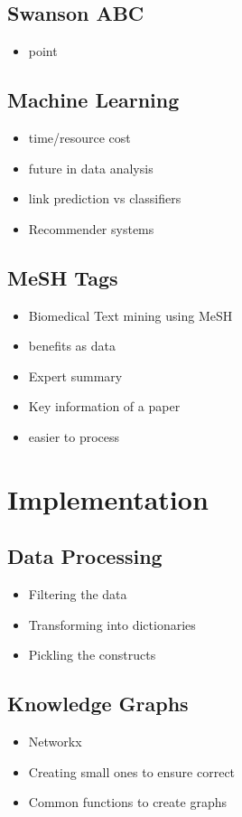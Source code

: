 \documentclass{l4proj}
\begin{document}
\section{Swanson ABC}
\begin{itemize}
    \item point
\end{itemize}
\section{Machine Learning}
\begin{itemize}
    \item time/resource cost
    \item future in data analysis
    \item link prediction vs classifiers
    \item Recommender systems
\end{itemize}
\section{MeSH Tags}
\begin{itemize}
    \item Biomedical Text mining using MeSH
    \item benefits as data 
    \item Expert summary
    \item Key information of a paper
    \item easier to process
\end{itemize}

\chapter{Implementation}
\section{Data Processing}
\begin{itemize}
    \item Filtering the data
    \item Transforming into dictionaries
    \item Pickling the constructs
\end{itemize}
\section{Knowledge Graphs}
\begin{itemize}
    \item Networkx
    \item Creating small ones to ensure correct
    \item Common functions to create graphs
\end{itemize}
\end{document}
